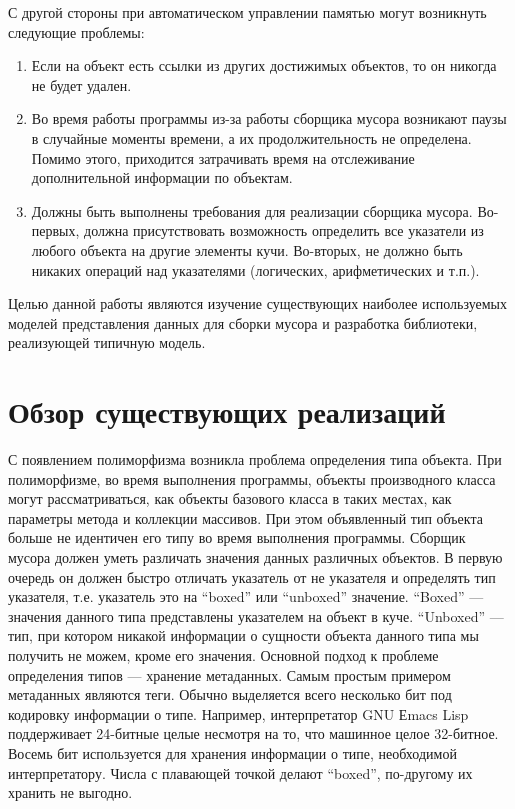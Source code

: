 С другой стороны при автоматическом управлении памятью могут возникнуть следующие проблемы:
\begin{enumerate}
\item Если на объект есть ссылки из других достижимых объектов, то он никогда не будет удален.
\item Во время работы программы из-за работы сборщика мусора возникают паузы в случайные моменты времени, а их продолжительность не определена.
Помимо этого, приходится затрачивать время на отслеживание дополнительной информации по объектам.
\item Должны быть выполнены  требования для реализации сборщика мусора.
Во-первых, должна присутствовать возможность определить все указатели из любого объекта на другие элементы кучи.
Во-вторых, не должно быть никаких операций над указателями (логических, арифметических и т.п.).
\end{enumerate}

Целью данной работы являются изучение существующих наиболее используемых моделей представления данных для сборки мусора и
разработка библиотеки, реализующей типичную модель.

\section{Обзор существующих реализаций}

С появлением полиморфизма возникла проблема определения типа объекта. При полиморфизме, во время выполнения программы,
объекты производного класса могут рассматриваться,
как объекты базового класса в таких местах, как параметры метода и коллекции
массивов. При этом объявленный тип объекта больше не идентичен его типу во время выполнения программы.
Сборщик мусора должен уметь различать значения данных различных объектов.
В первую очередь он должен быстро отличать указатель от не указателя и определять тип указателя,
т.е. указатель это на ``boxed''  или ``unboxed''  значение.
``Boxed'' --- значения данного типа представлены указателем на объект в куче. 
``Unboxed''  --- тип, при котором никакой информации о сущности объекта данного типа мы получить не можем, кроме его значения.
Основной подход к проблеме определения типов — хранение метаданных.
Самым простым примером метаданных являются теги.
Обычно выделяется всего несколько бит под кодировку информации о типе.
Например, интерпретатор
GNU Еmacs Lisp поддерживает 24-битные целые несмотря на то,
что машинное целое 32-битное.
Восемь бит используется для хранения информации о типе, необходимой интерпретатору.
Числа с плавающей точкой делают ``boxed'', по-другому их хранить не выгодно.

